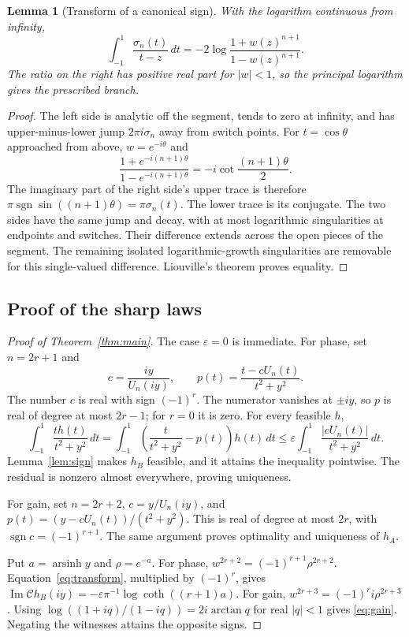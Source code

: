 \documentclass[11pt]{article}
\newtheorem{lemma}[theorem]{Lemma}
\theoremstyle{remark}\newtheorem{remark}[theorem]{Remark}
\newcommand{\eps}{\varepsilon}
\newcommand{\C}{\mathcal C}
\newcommand{\sgn}{\operatorname{sgn}}
\newcommand{\asinh}{\operatorname{arsinh}}
\newcommand{\Imag}{\operatorname{Im}}
\begin{document}
\begin{lemma}[Transform of a canonical sign]\label{lem:transform}
With the logarithm continuous from infinity,
\begin{equation}\label{eq:transform}
 \int_{-1}^{1}\frac{\sigma_n(t)}{t-z}\,dt
 =-2\log\frac{1+w(z)^{n+1}}{1-w(z)^{n+1}}.
\end{equation}
The ratio on the right has positive real part for $|w|<1$,
so the principal logarithm gives the prescribed branch.
\end{lemma}
\begin{proof}
The left side is analytic off the segment, tends to zero at infinity, and has
upper-minus-lower jump $2\pi i\sigma_n$ away from switch points.
For $t=\cos\theta$ approached from above, $w=e^{-i\theta}$ and
\[
 \frac{1+e^{-i(n+1)\theta}}{1-e^{-i(n+1)\theta}}
 =-i\cot\frac{(n+1)\theta}{2}.
\]
The imaginary part of the right side's upper trace is therefore
$\pi\sgn\sin((n+1)\theta)=\pi\sigma_n(t)$.
The lower trace is its conjugate. The two sides have the same jump and decay,
with at most logarithmic singularities at endpoints and switches.
Their difference extends across the open pieces of the segment.
The remaining isolated logarithmic-growth singularities are removable for
this single-valued difference. Liouville's theorem proves equality.
\end{proof}

\subsection{Proof of the sharp laws}
\begin{proof}[Proof of Theorem~\ref{thm:main}]
The case $\eps=0$ is immediate.
For phase, set $n=2r+1$ and
\[
 c=\frac{iy}{U_n(iy)},\qquad
 p(t)=\frac{t-cU_n(t)}{t^2+y^2}.
\]
The number $c$ is real with sign $(-1)^r$.
The numerator vanishes at $\pm iy$, so $p$ is real of degree at most $2r-1$;
for $r=0$ it is zero.
For every feasible $h$,
\begin{equation}\label{eq:dualsharp}
 \int_{-1}^{1}\frac{th(t)}{t^2+y^2}\,dt
 =\int_{-1}^{1}\left(\frac{t}{t^2+y^2}-p(t)\right)h(t)\,dt
 \leq\eps\int_{-1}^{1}\frac{|cU_n(t)|}{t^2+y^2}\,dt.
\end{equation}
Lemma~\ref{lem:sign} makes $h_B$ feasible, and it attains the inequality
pointwise. The residual is nonzero almost everywhere, proving uniqueness.

For gain, set $n=2r+2$, $c=y/U_n(iy)$, and
$p(t)=(y-cU_n(t))/(t^2+y^2)$. This is real of degree at most $2r$,
with $\sgn c=(-1)^{r+1}$. The same argument proves optimality and uniqueness
of $h_A$.

Put $a=\asinh y$ and $\rho=e^{-a}$.
For phase, $w^{2r+2}=(-1)^{r+1}\rho^{2r+2}$.
Equation~\eqref{eq:transform}, multiplied by $(-1)^r$,
gives $\Imag\C h_B(iy)=-\eps\pi^{-1}\log\coth((r+1)a)$.
For gain, $w^{2r+3}=(-1)^r i\rho^{2r+3}$.
Using $\log((1+iq)/(1-iq))=2i\arctan q$ for real $|q|<1$
gives \eqref{eq:gain}. Negating the witnesses attains the opposite signs.
\end{proof}
\end{document}
